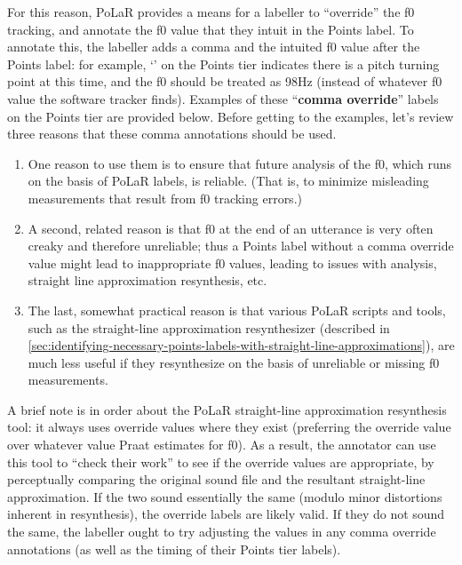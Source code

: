 \documentclass[11pt, twoside]{memoir}
\def\textlabel#1{{\relsize{-.5}\fontspec[Mapping=tex-text]{Roboto Mono}{#1}}}
\begin{document}
{{For this reason, PoLaR provides a means for a labeller to “override” the f0 tracking, and annotate the f0 value that they intuit in the Points label. To annotate this, the labeller adds a comma and the intuited f0 value after the Points label: for example, ‘\textlabel{0,98}’ on the Points tier indicates there is a pitch turning point at this time, and the f0 should be treated as 98Hz (instead of whatever f0 value the software tracker finds). Examples of these “\textbf{comma override}” labels on the Points tier are provided below.
Before getting to the examples, let’s review three reasons that these comma annotations should be used.
\begin{enumerate}
	\item One reason to use them is to ensure that future analysis of the f0, which runs on the basis of PoLaR labels, is reliable. (That is, to minimize misleading measurements that result from f0 tracking errors.)
	\item A second, related reason is that f0 at the end of an utterance is very often creaky and therefore unreliable; thus a Points label without a comma override value might lead to inappropriate f0 values, leading to issues with analysis, straight line approximation resynthesis, etc.
	\item The last, somewhat practical  reason is that various PoLaR scripts and tools, such as the straight-line approximation resynthesizer (described in \ref{sec:identifying-necessary-points-labels-with-straight-line-approximations}), are much less useful if they resynthesize on the basis of unreliable or missing f0 measurements.
\end{enumerate}
A brief note is in order about the PoLaR straight-line approximation resynthesis tool: it always uses override values where they exist (preferring the override value over whatever value Praat estimates for f0). As a result, the annotator can use this tool to “check their work” to see if the override values are appropriate, by perceptually comparing the original sound file and the resultant straight-line approximation. If the two sound essentially the same (modulo minor distortions inherent in resynthesis), the override labels are likely valid. If they do not sound the same, the labeller ought to try adjusting the values in any comma override annotations (as well as the timing of their Points tier labels).
}}
\end{document}

